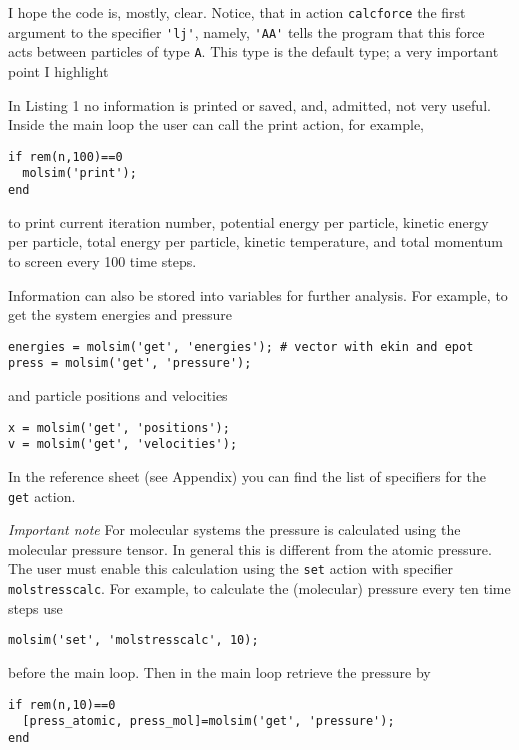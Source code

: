 \documentclass[11pt]{article}
\begin{document}
\bigskip

\noindent I hope the code is, mostly, clear. Notice, that in action \verb!calcforce! the 
first argument to the specifier \verb!'lj'!, namely, \verb!'AA'! tells the program that this 
force acts between particles of type \verb!A!. This type is the default type;
a very important point I highlight
\begin{center}
\end{center}


\noindent In Listing 1 no information is printed or saved, and, admitted, not very
useful. Inside the main loop the user can call the \textsf{print} action, for
example, 
\begin{verbatim}
if rem(n,100)==0
  molsim('print');
end
\end{verbatim}
to print current iteration number, potential energy per particle, kinetic energy
per particle, total energy per particle, kinetic temperature, and total momentum
to screen every 100 time steps.

Information can also be stored into variables for further analysis. For example,
to get the system energies and pressure
\begin{verbatim}
energies = molsim('get', 'energies'); # vector with ekin and epot
press = molsim('get', 'pressure');
\end{verbatim}
and particle positions and velocities
\begin{verbatim}
x = molsim('get', 'positions');
v = molsim('get', 'velocities');
\end{verbatim}
In the reference sheet (see Appendix) you can find the list of specifiers for the \verb!get! action.


\textit{Important note} For molecular systems the pressure is
calculated using the molecular pressure tensor. In general this is different
from the atomic pressure. The user must enable this calculation using the
\verb!set! action with specifier \verb!molstresscalc!. For example, to
calculate the (molecular) pressure every ten time steps use
\begin{verbatim}
molsim('set', 'molstresscalc', 10);
\end{verbatim}
before the main loop. Then in the main loop retrieve the pressure by
\begin{verbatim}
if rem(n,10)==0
  [press_atomic, press_mol]=molsim('get', 'pressure');
end
\end{verbatim}
\end{document}

